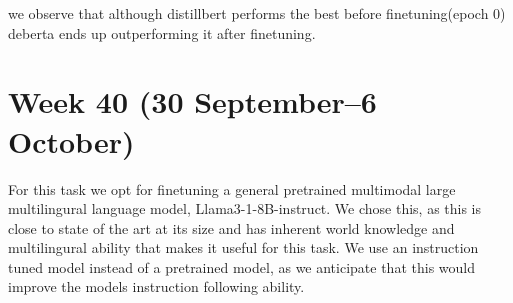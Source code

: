 \documentclass[11pt]{article}
\begin{document}
\begin{table}[ht]
    \centering
    \caption{Evaluation metrics for different languages}
    \label{tab:evaluation_metrics}
\end{table}

we observe that although distillbert performs the best before finetuning(epoch 0) deberta ends up outperforming it after finetuning.

\section{Week 40 (30 September--6 October)}
\label{sec:week40}

For this task we opt for finetuning a general pretrained multimodal large multilingural language model, Llama3-1-8B-instruct. 
We chose this, as this is close to state of the art at its size and has inherent world knowledge and multilingural ability that makes it useful for this task.
We use an instruction tuned model instead of a pretrained model, as we anticipate that this would improve the models instruction following ability.
\end{document}
